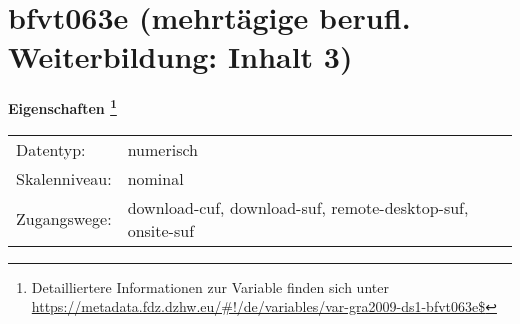 
    \setcounter{footnote}{0}

    \vspace*{-1.8cm}
	\section{bfvt063e (mehrtägige berufl. Weiterbildung: Inhalt 3)}
	\label{section:bfvt063e}



    \vspace*{0.5cm}
    \noindent\textbf{Eigenschaften
	\footnote{Detailliertere Informationen zur Variable finden sich unter
		\url{https://metadata.fdz.dzhw.eu/\#!/de/variables/var-gra2009-ds1-bfvt063e$}}}\\
	\begin{tabularx}{\hsize}{@{}lX}
	Datentyp: & numerisch \\
	Skalenniveau: & nominal \\
	Zugangswege: &
	  download-cuf, 
	  download-suf, 
	  remote-desktop-suf, 
	  onsite-suf
 \\
    \end{tabularx}



